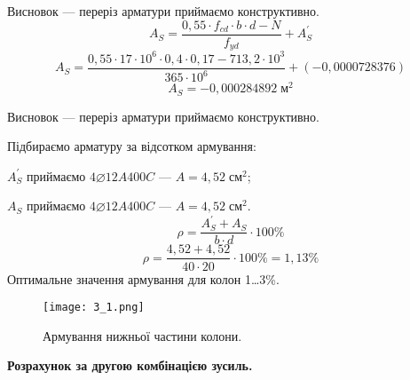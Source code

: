 \documentclass[a4paper,14pt]{article}
\begin{document}
\begin{enumerate}
        Висновок --- переріз арматури приймаємо конструктивно.
        \begin{equation}\label{eq:28}
            A_S = \dfrac{0,55 \cdot f_{cd} \cdot b \cdot d - N}{f_{yd}} + A_S^\prime
        \end{equation}
        $$A_S = \dfrac{0,55 \cdot 17 \cdot 10^6 \cdot 0,4 \cdot 0,17 - 713,2 \cdot 10^3}{365 \cdot 10^6} +(-0,0000728376)$$
        $$A_S = -0,000284892\;\textit{м}^2$$

        Висновок --- переріз арматури приймаємо конструктивно.

        Підбираємо арматуру за відсотком армування:

        $A_S^\prime$ приймаємо $4\varnothing12A400C$ --- $A = 4,52\;\textit{см}^2$;

        $A_S$ приймаємо $4\varnothing12A400C$ --- $A = 4,52\;\textit{см}^2$.
        \begin{equation}\label{eq:29}
            \rho = \dfrac{A_S^\prime + A_S}{b \cdot d} \cdot 100\%
        \end{equation}
        $$\rho = \dfrac{4,52 + 4,52}{40 \cdot 20} \cdot 100\% = 1,13\%$$
        Оптимальне значення армування для колон 1\ldots 3\%.    
\end{enumerate}
\begin{figure}[h!]
    \begin{center}
        \texttt{[image: 3\_1.png]}
        \caption{Армування нижньої частини колони.}\label{ris3_1} 
    \end{center}
\end{figure}
\textbf{Розрахунок за другою комбінацією зусиль.}
\end{document}

